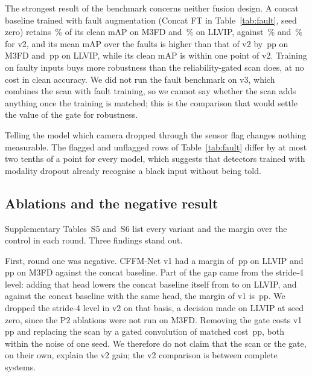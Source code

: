 The strongest result of the benchmark concerns neither fusion design. A concat baseline trained with fault augmentation (Concat FT in Table~\ref{tab:fault}, seed zero) retains \fltMfdConcatFtRetainedSevThreePercent{}\,\% of its clean mAP on M3FD and \fltLlvipConcatFtRetainedSevThreePercent{}\,\% on LLVIP, against \fltMfdCffmVtwoMeanRetainedSevThreePercent{}\,\% and \fltLlvipCffmVtwoRetainedSevThreePercent{}\,\% for v2, and its mean mAP over the faults is higher than that of v2 by \fltMfdVtwoVsConcatFtGapSevThreeMap{}\,pp on M3FD and \fltLlvipVtwoVsConcatFtGapSevThreeMap{}\,pp on LLVIP, while its clean mAP is within one point of v2. Training on faulty inputs buys more robustness than the reliability-gated scan does, at no cost in clean accuracy. We did not run the fault benchmark on v3, which combines the scan with fault training, so we cannot say whether the scan adds anything once the training is matched; this is the comparison that would settle the value of the gate for robustness.

Telling the model which camera dropped through the sensor flag changes nothing measurable. The flagged and unflagged rows of Table~\ref{tab:fault} differ by at most two tenths of a point for every model, which suggests that detectors trained with modality dropout already recognise a black input without being told.



\subsection{Ablations and the negative result}
\label{sec:ablation}
Supplementary Tables~S5 and~S6 list every variant and the margin over the control in each round. Three findings stand out.

First, round one was negative. CFFM-Net v1 had a margin of \marLlvipVoneVsConcatPlainSeedZeroMap{}\,pp on LLVIP and \marMfdVoneVsConcatPlainSeedZeroMap{}\,pp on M3FD against the concat baseline. Part of the gap came from the stride-4 level: adding that head lowers the concat baseline itself from \resLlvipConcatPlainSeedZeroMap{} to \resLlvipConcatPtwoSeedZeroMap{} on LLVIP, and against the concat baseline with the same head, the margin of v1 is \marLlvipVoneVsConcatPtwoSeedZeroMap{}\,pp. We dropped the stride-4 level in v2 on that basis, a decision made on LLVIP at seed zero, since the P2 ablations were not run on M3FD. Removing the gate costs v1 \marLlvipVoneVsVoneNogateSeedZeroMap{}\,pp and replacing the scan by a gated convolution of matched cost \marLlvipVoneVsVoneGconvSeedZeroMap{}\,pp, both within the noise of one seed. We therefore do not claim that the scan or the gate, on their own, explain the v2 gain; the v2 comparison is between complete systems.

